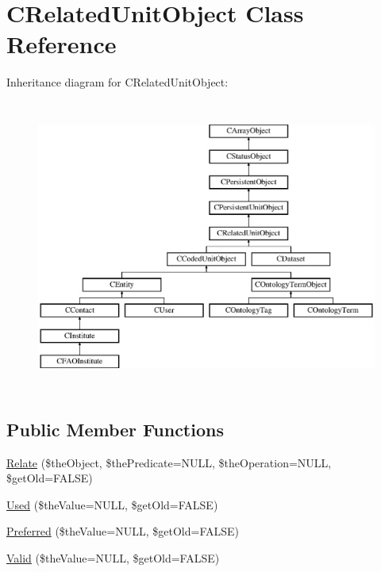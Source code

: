 \hypertarget{class_c_related_unit_object}{\section{C\-Related\-Unit\-Object Class Reference}
\label{class_c_related_unit_object}
}
Inheritance diagram for C\-Related\-Unit\-Object\-:\begin{figure}[H]
\begin{center}
\leavevmode
\includegraphics[height=9.655172cm]{class_c_related_unit_object}
\end{center}
\end{figure}
\subsection*{Public Member Functions}
\begin{DoxyCompactItemize}
\item 
\hyperlink{class_c_related_unit_object_a46a7033129ae23ecda7f879f3fabdd5c}{Relate} (\$the\-Object, \$the\-Predicate=N\-U\-L\-L, \$the\-Operation=N\-U\-L\-L, \$get\-Old=F\-A\-L\-S\-E)
\item 
\hyperlink{class_c_related_unit_object_a6f19ef5d6eb0414712a16919e0ef3d5d}{Used} (\$the\-Value=N\-U\-L\-L, \$get\-Old=F\-A\-L\-S\-E)
\item 
\hyperlink{class_c_related_unit_object_a5f4a93894d26ead9fe1b80e39975ec12}{Preferred} (\$the\-Value=N\-U\-L\-L, \$get\-Old=F\-A\-L\-S\-E)
\item 
\hyperlink{class_c_related_unit_object_aea51a443754ab8c86a23ece7a2b18b1f}{Valid} (\$the\-Value=N\-U\-L\-L, \$get\-Old=F\-A\-L\-S\-E)
\end{DoxyCompactItemize}
